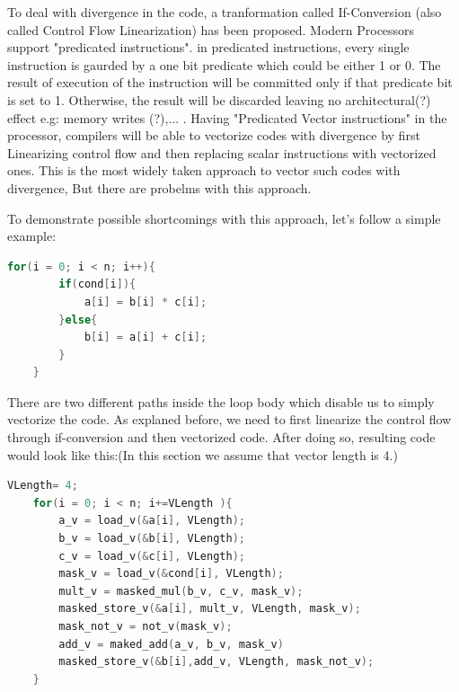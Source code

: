 \documentclass[\main/thesis.tex]{subfiles}
\begin{document}
To deal with divergence in the code, a tranformation called If-Conversion (also called Control Flow Linearization)  has been proposed. Modern Processors support "predicated instructions". in predicated instructions, every single instruction is 
gaurded by a one bit predicate which could be either 1 or 0. The result of execution of the instruction will be committed only if that predicate bit is set to 1. Otherwise, the result will be discarded leaving no architectural(?) effect e.g: memory writes (?),... .
Having "Predicated Vector instructions" in the processor, compilers will be able to vectorize codes with divergence by first Linearizing control flow and then replacing scalar instructions with vectorized ones.
This is the most widely taken approach to vector such codes with divergence, But there are probelms with this approach.

To demonstrate possible shortcomings with this approach, let's follow a simple example: 





\begin{lstlisting}[language=C, caption={Motivating Example}]
    for(i = 0; i < n; i++){
        if(cond[i]){
            a[i] = b[i] * c[i];
        }else{
            b[i] = a[i] + c[i];
        }
    }
\end{lstlisting}

There are two different paths inside the loop body which disable us to simply vectorize the code. As explaned before, we need to first linearize the control flow through if-conversion and then vectorized code. After doing so, resulting code 
would look like this:(In this section we assume that vector length is 4.)

\begin{lstlisting}[language=C]
    VLength= 4;
    for(i = 0; i < n; i+=VLength ){
        a_v = load_v(&a[i], VLength);
        b_v = load_v(&b[i], VLength);
        c_v = load_v(&c[i], VLength);
        mask_v = load_v(&cond[i], VLength);
        mult_v = masked_mul(b_v, c_v, mask_v);
        masked_store_v(&a[i], mult_v, VLength, mask_v);
        mask_not_v = not_v(mask_v);
        add_v = maked_add(a_v, b_v, mask_v)
        masked_store_v(&b[i],add_v, VLength, mask_not_v);
    }
\end{lstlisting}
\end{document}
